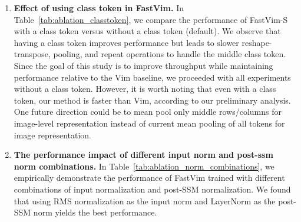 \begin{enumerate}

\item \textbf{Effect of using class token in FastVim.} In Table~\ref{tab:ablation_classtoken}, we compare the performance of FastVim-S with a class token versus without a class token (default). We observe that having a class token improves performance but leads to slower reshape-transpose, pooling, and repeat operations to handle the middle class token. Since the goal of this study is to improve throughput while maintaining performance relative to the Vim baseline, we proceeded with all experiments without a class token. However, it is worth noting that even with a class token, our method is faster than Vim, according to our preliminary analysis. One future direction could be to mean pool only middle rows/columns for image-level representation instead of current mean pooling of all tokens for image representation. 
\\

\begin{table}[!h]
    \caption{Effect of using class token in FastVim on ImageNet-1K.} 
    \begin{center}
\end{center}
    \label{tab:ablation_classtoken}
\end{table}


\item  \textbf{The performance impact of different input norm and post-ssm norm combinations.} In Table~\ref{tab:ablation_norm_combinations}, we empirically demonstrate the performance of FastVim trained with different combinations of input normalization and post-SSM normalization. We found that using RMS normalization as the input norm and LayerNorm as the post-SSM norm yields the best performance.
\\

\begin{table}[!h]
    \caption{Effect of using different normalization combination in FastVim-S on ImageNet-1K.} 
    \begin{center}
\end{center}
    \label{tab:ablation_norm_combinations}
\end{table}





\end{enumerate}
